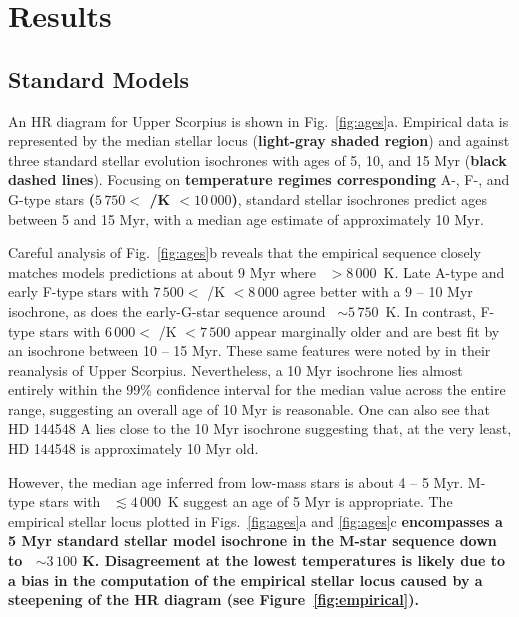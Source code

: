 \documentclass{aa}
\begin{document}
\section{Results}
\label{sec:results}

\subsection{Standard Models}
An HR diagram for Upper Scorpius is shown in Fig.~\ref{fig:ages}a. Empirical data is represented by the median stellar locus ({\bf light-gray shaded region}) and against three standard stellar evolution isochrones with ages of 5, 10, and 15 Myr ({\bf black dashed lines}). Focusing on {\bf temperature regimes corresponding} A-, F-, and G-type stars {\bf ($5\,750 <$ \teff/K $< 10\,000$)}, standard stellar isochrones predict ages between 5 and 15 Myr, with a median age estimate of approximately 10 Myr. %

Careful analysis of Fig.~\ref{fig:ages}b reveals that the empirical sequence closely matches models predictions at about 9 Myr where \teff~$> 8\,000$~K. Late A-type and early F-type stars with $7\,500 < $ \teff/K $ < 8\,000$ agree better with a 9 -- 10 Myr isochrone, as does the early-G-star sequence around \teff\ $\sim 5\,750$~K. In contrast, F-type stars with $6\,000 <$ \teff/K $< 7\,500$ appear marginally older and are best fit by an isochrone between 10 -- 15 Myr. These same features were noted by \citet{Pecaut2012} in their reanalysis of Upper Scorpius. Nevertheless, a 10 Myr isochrone lies almost entirely within the 99\% confidence interval for the median value across the entire range, suggesting an overall age of 10 Myr is reasonable. One can also see that HD 144548 A lies close to the 10 Myr isochrone suggesting that, at the very least, HD 144548 is approximately 10 Myr old.

However, the median age inferred from low-mass stars is about 4 -- 5 Myr. M-type stars with \teff\ $\lesssim 4\,000$~K suggest an age of 5 Myr is appropriate. The empirical stellar locus plotted in Figs.~\ref{fig:ages}a and \ref{fig:ages}c {\bf encompasses a 5 Myr standard stellar model isochrone in the M-star sequence down to \teff\ $\sim3\,100$ K. Disagreement at the lowest temperatures is likely due to a bias in the computation of the empirical stellar locus caused by a steepening of the HR diagram (see Figure~\ref{fig:empirical}).}
\end{document}
